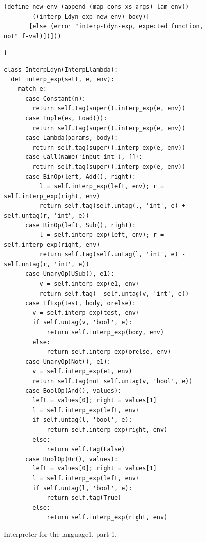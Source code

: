 \documentclass[7x10]{TimesAPriori_MIT}%
\def\pythonEd{1}
\def\edition{1}
\newcommand{\pythonColor}[0]{}
\newcommand{\python}[1]{{\if\edition\pythonEd\pythonColor #1\fi}}
\numberwithin{theorem}{chapter}
\numberwithin{definition}{chapter}
\numberwithin{equation}{chapter}
\begin{document}
\begin{figure}[tbp]
\begin{tcolorbox}[colback=white]
{\begin{lstlisting}[basicstyle=\ttfamily\footnotesize]
        (define new-env (append (map cons xs args) lam-env))
        ((interp-Ldyn-exp new-env) body)]
       [else (error "interp-Ldyn-exp, expected function, not" f-val)])]))
\end{lstlisting}
\fi}
{\if\edition\pythonEd\pythonColor
\begin{lstlisting}[basicstyle=\ttfamily\scriptsize]
class InterpLdyn(InterpLlambda):
  def interp_exp(self, e, env):
    match e:
      case Constant(n):
        return self.tag(super().interp_exp(e, env))
      case Tuple(es, Load()):
        return self.tag(super().interp_exp(e, env))
      case Lambda(params, body):
        return self.tag(super().interp_exp(e, env))
      case Call(Name('input_int'), []):
        return self.tag(super().interp_exp(e, env))
      case BinOp(left, Add(), right):
          l = self.interp_exp(left, env); r = self.interp_exp(right, env)
          return self.tag(self.untag(l, 'int', e) + self.untag(r, 'int', e))
      case BinOp(left, Sub(), right):
          l = self.interp_exp(left, env); r = self.interp_exp(right, env)
          return self.tag(self.untag(l, 'int', e) - self.untag(r, 'int', e))
      case UnaryOp(USub(), e1):
          v = self.interp_exp(e1, env)
          return self.tag(- self.untag(v, 'int', e))
      case IfExp(test, body, orelse):
        v = self.interp_exp(test, env)
        if self.untag(v, 'bool', e):
            return self.interp_exp(body, env)
        else:
            return self.interp_exp(orelse, env)
      case UnaryOp(Not(), e1):
        v = self.interp_exp(e1, env)
        return self.tag(not self.untag(v, 'bool', e))
      case BoolOp(And(), values):
        left = values[0]; right = values[1]
        l = self.interp_exp(left, env)
        if self.untag(l, 'bool', e):
            return self.interp_exp(right, env)
        else:
            return self.tag(False)
      case BoolOp(Or(), values):
        left = values[0]; right = values[1]
        l = self.interp_exp(left, env)
        if self.untag(l, 'bool', e):
            return self.tag(True)
        else:
            return self.interp_exp(right, env)
\end{lstlisting}
\fi}
  \end{tcolorbox}

  \caption{Interpreter for the \LangDyn{} language\python{, part 1}.}
\label{fig:interp-Ldyn}
\end{figure}
\end{document}
